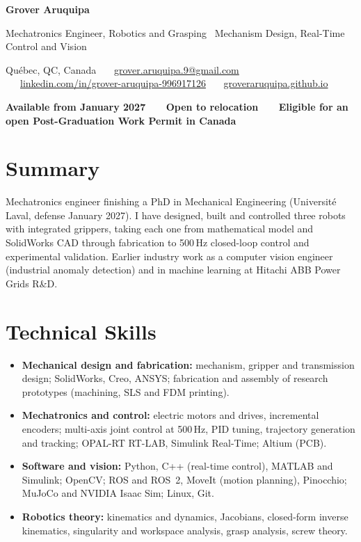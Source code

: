 \documentclass[10pt,letterpaper]{article}
\begin{document}
{\LARGE\bfseries Grover Aruquipa}\par\vspace{2pt}
{\large Mechatronics Engineer, Robotics and Grasping \textbar\ Mechanism Design, Real-Time Control and Vision}\par\vspace{3pt}
{\small Qu\'ebec, QC, Canada \ \textbullet\ \
\href{mailto:grover.aruquipa.9@gmail.com}{grover.aruquipa.9@gmail.com} \ \textbullet\ \
\href{https://www.linkedin.com/in/grover-aruquipa-996917126}{linkedin.com/in/grover-aruquipa-996917126} \ \textbullet\ \
\href{https://groveraruquipa.github.io}{groveraruquipa.github.io}}\par\vspace{1pt}
{\small\bfseries Available from January 2027 \ \textbullet\ \ Open to relocation \ \textbullet\ \ Eligible for an open Post-Graduation Work Permit in Canada}\par

\section{Summary}
Mechatronics engineer finishing a PhD in Mechanical Engineering (Universit\'e Laval, defense January 2027). I have designed,
built and controlled three robots with integrated grippers, taking each one from mathematical model and SolidWorks CAD
through fabrication to 500\,Hz closed-loop control and experimental validation. Earlier industry work as a computer
vision engineer (industrial anomaly detection) and in machine learning at Hitachi ABB Power Grids R\&D.

\section{Technical Skills}
\begin{itemize}
\item \textbf{Mechanical design and fabrication:} mechanism, gripper and transmission design; SolidWorks, Creo, ANSYS;
fabrication and assembly of research prototypes (machining, SLS and FDM printing).
\item \textbf{Mechatronics and control:} electric motors and drives, incremental encoders; multi-axis joint control at
500\,Hz, PID tuning, trajectory generation and tracking; OPAL-RT RT-LAB, Simulink Real-Time; Altium (PCB).
\item \textbf{Software and vision:} Python, C++ (real-time control), MATLAB and Simulink; OpenCV; ROS and ROS~2, MoveIt
(motion planning), Pinocchio; MuJoCo and NVIDIA Isaac Sim; Linux, Git.
\item \textbf{Robotics theory:} kinematics and dynamics, Jacobians, closed-form inverse kinematics, singularity and
workspace analysis, grasp analysis, screw theory.
\end{itemize}
\end{document}
